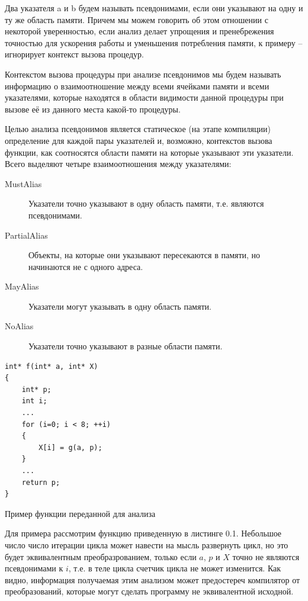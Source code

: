 \begin{mydefinition}
Два указателя a и b будем называть псевдонимами, если они указывают на одну и ту же область памяти. Причем мы можем говорить об этом отношении с некоторой уверенностью, если анализ делает упрощения и пренебрежения точностью для ускорения работы и уменьшения потребления памяти, к примеру -- игнорирует контекст вызова процедур.
\end{mydefinition}

\begin{mydefinition}
Контекстом вызова процедуры при анализе псевдонимов мы будем называть информацию о взаимоотношение между всеми ячейками памяти и всеми указателями, которые находятся в области видимости данной процедуры при вызове её из данного места какой-то процедуры. 
\end{mydefinition}

Целью анализа псевдонимов является статическое (на этапе компиляции) определение для каждой пары указателей и, возможно, контекстов вызова функции, как соотносятся области памяти на которые указывают эти указатели. Всего выделяют четыре взаимоотношения между указателями:
\begin{description}
  \item[MustAlias] Указатели точно указывают в одну область памяти, т.е. являются псевдонимами.
  \item[PartialAlias] Объекты, на которые они указывают пересекаются в памяти, но начинаются не с одного адреса.
  \item[MayAlias] Указатели могут указывать в одну область памяти.
  \item[NoAlias] Указатели точно указывают в разные области памяти.
\end{description}

\begin{ListingEnv}[H]
\begin{lstlisting}
int* f(int* a, int* X)
{
    int* p;
    int i;
    ...
    for (i=0; i < 8; ++i)
    {
        X[i] = g(a, p);
    }
    ...
    return p;
}
\end{lstlisting}
\caption{Пример функции переданной для анализа}
\end{ListingEnv}

Для примера рассмотрим функцию приведенную в листинге 0.1. Небольшое число число итерации цикла может навести на мысль развернуть цикл, но это будет эквивалентным преобразрованием, только если $a$, $p$ и $X$ точно не являются псевдонимами к $i$, т.е. в теле цикла счетчик цикла не может изменится. Как видно, информация получаемая этим анализом может предостереч компилятор от преобразований, которые могут сделать программу не эквивалентной исходной.

